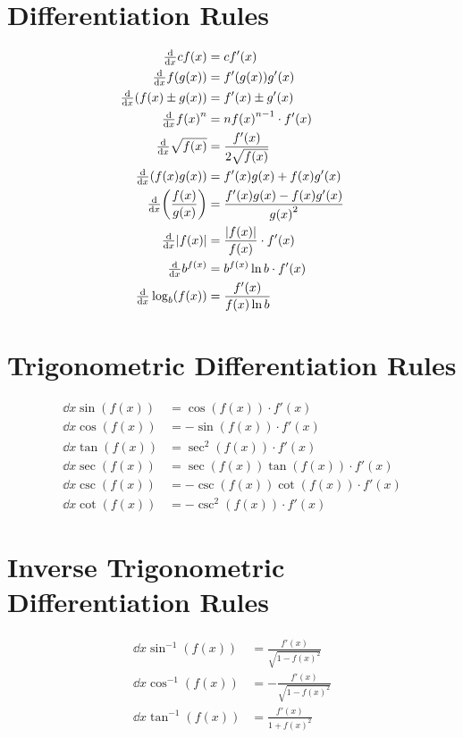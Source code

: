 \documentclass[12pt]{article}
\DeclarePairedDelimiter\abs{\lvert}{\rvert}
\DeclarePairedDelimiter\paren{(}{)}
\newcommand*{\asin}{\sin^{-1}}
\newcommand*{\acos}{\cos^{-1}}
\newcommand*{\atan}{\tan^{-1}}
\newcommand*{\fixmath}{%
  \makebox{}\vspace{\glueexpr-\baselineskip-\abovedisplayskip}}
\newenvironment{fixskip}{\setlength{\abovedisplayskip}{0pt}%
  \setlength{\belowdisplayskip}{0pt}\fixmath\ignorespaces}%
  {\ignorespacesafterend}
\begin{document}
\section*{Differentiation Rules}
\begin{fixskip}
  \begin{align*}
    \dd{x}c f(x) &= c f'(x)\\
    \dd{x}f(g(x)) &= f'(g(x))g'(x)\\
    \dd{x}(f(x) \pm g(x)) &= f'(x) \pm g'(x)\\
    \dd{x}{f(x)}^n &= n{f(x)}^{n-1} \cdot f'(x)\\
    \dd{x}\sqrt{f(x)} &= \frac{f'(x)}{2\sqrt{f(x)}}\\
    \dd{x}(f(x)g(x)) &= f'(x)g(x) + f(x)g'(x)\\
    \dd{x}\paren*{\frac{f(x)}{g(x)}} &= \frac{f'(x)g(x) - f(x)g'(x)}
      {{g(x)}^2}\\
    \dd{x}\abs*{f(x)} &= \frac{\abs*{f(x)}}{f(x)} \cdot f'(x)\\
    \dd{x}b^{f(x)} &= b^{f(x)} \ln b \cdot f'(x)\\
    \dd{x}\log_b(f(x)) &= \frac{f'(x)}{f(x) \ln b}
  \end{align*}
\end{fixskip}
\section*{Trigonometric Differentiation Rules}
\begin{fixskip}
  \begin{align*}
    \dd{x}\sin(f(x)) &= \cos(f(x)) \cdot f'(x)\\
    \dd{x}\cos(f(x)) &= -\sin(f(x)) \cdot f'(x)\\
    \dd{x}\tan(f(x)) &= \sec^2(f(x)) \cdot f'(x)\\
    \dd{x}\sec(f(x)) &= \sec(f(x))\tan(f(x)) \cdot f'(x)\\
    \dd{x}\csc(f(x)) &= -\csc(f(x))\cot(f(x)) \cdot f'(x)\\
    \dd{x}\cot(f(x)) &= -\csc^2(f(x)) \cdot f'(x)
  \end{align*}
\end{fixskip}
\section*{Inverse Trigonometric Differentiation Rules}
\begin{fixskip}
  \begin{align*}
    \dd{x}\asin(f(x)) &= \frac{f'(x)}{\sqrt{1 - {f(x)}^2}}\\
    \dd{x}\acos(f(x)) &= -\frac{f'(x)}{\sqrt{1 - {f(x)}^2}}\\
    \dd{x}\atan(f(x)) &= \frac{f'(x)}{1 + {f(x)}^2}
  \end{align*}
\end{fixskip}
\end{document}
